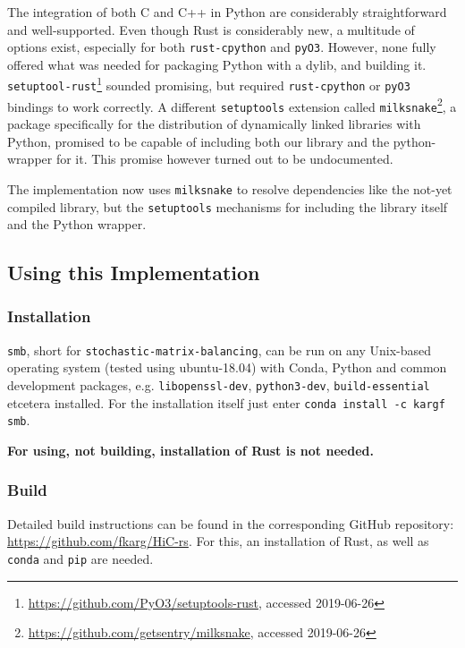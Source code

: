 The integration of both C and C++ in Python are considerably straightforward
and well-supported. Even though Rust is considerably new, a multitude of
options exist, especially for both \verb|rust-cpython| and \verb|pyO3|.
However, none fully offered what was needed for packaging Python with a dylib,
and building it.
\verb|setuptool-rust|\footnote{\url{https://github.com/PyO3/setuptools-rust},
accessed 2019-06-26} sounded promising, but required \verb|rust-cpython| or
\verb|pyO3| bindings to work correctly. A different \verb|setuptools| extension
called \verb|milksnake|\footnote{\url{https://github.com/getsentry/milksnake},
accessed 2019-06-26}, a package specifically for the distribution of
dynamically linked libraries with Python, promised to be capable of including
both our library and the python-wrapper for it. This promise however turned out
to be undocumented.

The implementation now uses \verb|milksnake| to resolve dependencies like the
not-yet compiled library, but the \verb|setuptools| mechanisms for including
the library itself and the Python wrapper.




\subsection{Using this Implementation}\label{sec:using}

\subsubsection{Installation}\label{sec:install}


\verb|smb|, short for \verb|stochastic-matrix-balancing|, can be run on any
Unix-based operating system (tested using ubuntu-18.04) with Conda, Python and
common development packages, e.g. \verb!libopenssl-dev!, \verb!python3-dev!,
\verb!build-essential! etcetera installed. For the installation itself just
enter \verb|conda install -c kargf smb|.

\textbf{For using, not building, installation of Rust is not needed.}


\subsubsection{Build}\label{sec:build}

Detailed build instructions can be found in the corresponding GitHub
repository: \url{https://github.com/fkarg/HiC-rs}. For this, an installation of
Rust, as well as \verb|conda| and \verb|pip| are needed.



